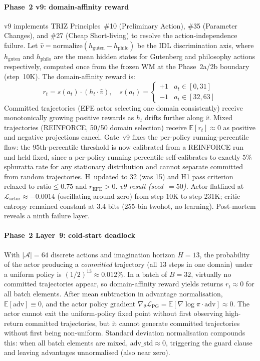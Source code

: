 \documentclass[journal,onecolumn,11pt]{IEEEtran}
\begin{document}
\paragraph{Phase~2 v9: domain-affinity reward}
v9 implements TRIZ Principles~\#10 (Preliminary Action), \#35 (Parameter Changes),
and \#27 (Cheap Short-living) to resolve the action-independence failure.
Let $\hat{v} = \text{normalize}(h_{\text{guten}} - h_{\text{philo}})$ be the IDL
discrimination axis, where $h_{\text{guten}}$ and $h_{\text{philo}}$ are the
mean hidden states for Gutenberg and philosophy actions respectively, computed
once from the frozen WM at the Phase~2a/2b boundary (step~10K).
The domain-affinity reward is:
\begin{equation}
  r_t = s(a_t) \cdot (h_t \cdot \hat{v}), \quad
  s(a_t) = \begin{cases} +1 & a_t \in [0,31] \\ -1 & a_t \in [32,63] \end{cases}
  \label{eq:domain_affinity}
\end{equation}
Committed trajectories (EFE actor selecting one domain consistently) receive
monotonically growing positive rewards as $h_t$ drifts further along $\hat{v}$.
Mixed trajectories (REINFORCE, 50/50 domain selection) receive $\mathbb{E}[r_t]\approx 0$
as positive and negative projections cancel.
Gate~v9 fixes the per-policy running-percentile flaw: the 95th-percentile threshold
is now calibrated from a REINFORCE run and held fixed, since a per-policy running
percentile self-calibrates to exactly 5\% sphurattā rate for any stationary
distribution and cannot separate committed from random trajectories.
H~updated to 32 (was 15) and H1 pass criterion relaxed to $\text{ratio} \le 0.75$
and $\overline{r}_\text{EFE} > 0$.
\emph{v9 result (seed~$=50$).} Actor flatlined at $\mathcal{L}_{\text{actor}} \approx {-}0.0014$
(oscillating around zero) from step 10K to step 231K; critic entropy remained constant at
$3.4$ bits (255-bin twohot, no learning). Post-mortem reveals a ninth failure layer.

\paragraph{Phase~2 Layer~9: cold-start deadlock}
With $|\mathcal{A}|{=}64$ discrete actions and imagination horizon $H{=}13$, the probability
of the actor producing a \emph{committed} trajectory (all 13 steps in one domain) under a
uniform policy is $(1/2)^{13} \approx 0.012\%$.
In a batch of $B{=}32$, virtually no committed trajectories appear, so domain-affinity
reward yields returns $r_t\approx 0$ for all batch elements.
After mean subtraction in advantage normalisation, $\mathbb{E}[\text{adv}]\equiv 0$, and
the actor policy gradient $\nabla_\theta\mathcal{L}_\text{PG} = \mathbb{E}[\nabla\log\pi \cdot \text{adv}] \approx 0$.
The actor cannot exit the uniform-policy fixed point without first observing high-return
committed trajectories, but it cannot generate committed trajectories without first
being non-uniform.
Standard deviation normalisation compounds this: when all batch elements are mixed,
$\text{adv\_std} \approx 0$, triggering the guard clause and leaving advantages unnormalised
(also near zero).
\end{document}
